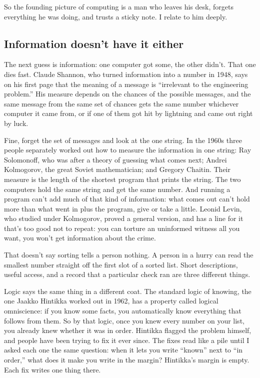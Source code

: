 \documentclass[11pt,twoside]{article}
\theoremstyle{thielethm}
\theoremstyle{thieledef}
\theoremstyle{thieledef}
\theoremstyle{thieledef}
\theoremstyle{thielethm}
\theoremstyle{thieleobs}
\theoremstyle{thielethm}
\begin{document}
So the founding picture of computing is a man who leaves his desk, forgets everything he was doing, and trusts a sticky note. I relate to him deeply.

\subsection{Information doesn't have it either}

The next guess is information: one computer got some, the other didn't. That one dies fast. Claude Shannon, who turned information into a number in 1948, says on his first page that the meaning of a message is ``irrelevant to the engineering problem.'' His measure depends on the chances of the possible messages, and the same message from the same set of chances gets the same number whichever computer it came from, or if one of them got hit by lightning and came out right by luck.

Fine, forget the set of messages and look at the one string. In the 1960s three people separately worked out how to measure the information in one string: Ray Solomonoff, who was after a theory of guessing what comes next; Andrei Kolmogorov, the great Soviet mathematician; and Gregory Chaitin. Their measure is the length of the shortest program that prints the string. The two computers hold the same string and get the same number. And running a program can't add much of that kind of information: what comes out can't hold more than what went in plus the program, give or take a little. Leonid Levin, who studied under Kolmogorov, proved a general version, and has a line for it that's too good not to repeat: you can torture an uninformed witness all you want, you won't get information about the crime.

That doesn't say sorting tells a person nothing. A person in a hurry can read the smallest number straight off the first slot of a sorted list. Short descriptions, useful access, and a record that a particular check ran are three different things.

Logic says the same thing in a different coat. The standard logic of knowing, the one Jaakko Hintikka worked out in 1962, has a property called logical omniscience: if you know some facts, you automatically know everything that follows from them. So by that logic, once you knew every number on your list, you already knew whether it was in order. Hintikka flagged the problem himself, and people have been trying to fix it ever since. The fixes read like a pile until I asked each one the same question: when it lets you write ``known'' next to ``in order,'' what does it make you write in the margin? Hintikka's margin is empty. Each fix writes one thing there.
\end{document}

